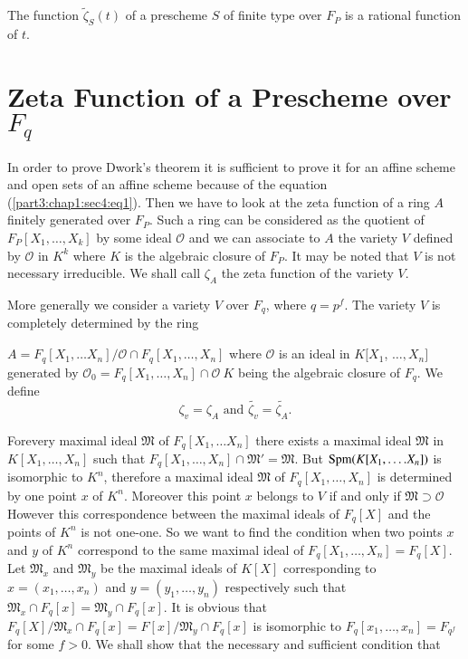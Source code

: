 \setcounter{theorem}{0}
\begin{theorem}\label{part3:chap2:sec5:thm1}
  The function $\tilde{\zeta}_S(t)$ of a prescheme $S$ of finite type
  over $F_P$ is a rational function of $t$. 
\end{theorem}

\section{Zeta Function of a Prescheme over $F_q$}\label{part3:chap2:sec6}

In order to prove Dwork's theorem it is sufficient to prove it for an
affine scheme and open sets of an affine scheme because of the
equation (\ref{part3:chap1:sec4:eq1}). Then we have to look at the
zeta function of a ring $A$ 
finitely generated over $F_P$. Such a ring can be considered as the
quotient of $F_P[X_1,\ldots, X_k ]$ by some ideal $\mathscr{O}$ and we
can associate to $A$ the variety $V$ defined by $\mathscr{O}$ in $K^k$
where $K$ is the algebraic closure of $F_P$. It may be noted that $V$
is not necessary irreducible. We shall call $\zeta _A$ the zeta
function of the variety $V$. 

More generally we consider a variety $V$ over $F_q$, where
$q=p^{f}$. The variety $V$ is completely determined by the ring 

$A=F_q[X_1,\ldots X_n] / \mathscr{O}\cap F_q[X_1,\ldots, X_n]$ where
$\mathscr{O}$ is an ideal in $K[X_1$, $\ldots,X_n]$ generated by
$\mathscr{O}_0=F_q[X_1,\ldots,X_n ]\cap \mathscr{O}~ K$ being the
algebraic closure of $F_q$. We define 
$$
\zeta_v=\zeta_A \text{ and } \tilde{\zeta_v}=\tilde{\zeta_A}.
$$

For\pageoriginale every maximal ideal $\mathfrak{M}$ of $F_q[X_1,\ldots X_n]$ there
exists a maximal ideal $\mathfrak{M}$ in $K[X_1,\ldots, X_n]$ such that
$F_q[X_1, \ldots,X_n]\cap \mathfrak{M}'=\mathfrak{M}$. But $\operatorname{Spm} (K[X_1,
  \ldots.X_n])$ is isomorphic to $K^n$, therefore a maximal ideal
$\mathfrak{M}$ of $F_q[X_1,\ldots,X_n]$ is determined by one point $x$
of $K^n$. Moreover this point $x$ belongs to $V$ if and only if
$\mathfrak{M} \supset \mathscr{O}$ However this correspondence between the
maximal ideals of $F_q[X]$ and the points of $K^n$ is not one-one. So
we want to find the condition when two points $x$ and $y$ of $K^n$
correspond to the same maximal ideal of
$F_q[X_1,\ldots,X_n]=F_q[X]$. Let $\mathfrak{M}_x$ and $\mathfrak{M}_y$
be the maximal ideals of $K[X]$ corresponding to $x=(x_1,\ldots, x_n)$
and $y=(y_1,\ldots,y_n)$ respectively such that $\mathfrak{M}_x \cap
F_q[x]=\mathfrak{M}_y \cap F_q[x]$. It is obvious that
$F_q[X]/\mathfrak{M}_x \cap F_q[x]=F[x]/\mathfrak{M}_y \cap F_q[x]$ is
isomorphic to $F_q[x_1,\ldots,x_n]=F_{q^f}$ for some $f>0$. We shall
show that the necessary and sufficient condition that 

